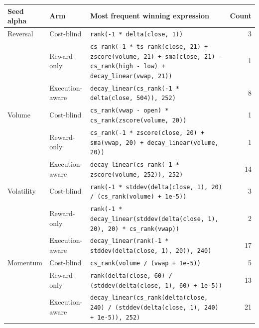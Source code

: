 \begin{tabular}{llp{}r}
\toprule
Seed alpha & Arm & Most frequent winning expression & Count \\
\midrule
Reversal & Cost-blind & \texttt{\footnotesize rank(-1 * delta(close, 1))} & 3 \\
 & Reward-only & \texttt{\footnotesize cs\_rank(-1 * ts\_rank(close, 21) + zscore(volume, 21) + sma(close, 21) - cs\_rank(high - low) + decay\_linear(vwap, 21))} & 1 \\
 & Execution-aware & \texttt{\footnotesize decay\_linear(cs\_rank(-1 * delta(close, 504)), 252)} & 8 \\
\addlinespace
Volume & Cost-blind & \texttt{\footnotesize cs\_rank(vwap - open) * cs\_rank(zscore(volume, 20))} & 1 \\
 & Reward-only & \texttt{\footnotesize cs\_rank(-1 * zscore(close, 20) + sma(vwap, 20) + decay\_linear(volume, 20))} & 1 \\
 & Execution-aware & \texttt{\footnotesize decay\_linear(cs\_rank(-1 * zscore(volume, 252)), 252)} & 14 \\
\addlinespace
Volatility & Cost-blind & \texttt{\footnotesize rank(-1 * stddev(delta(close, 1), 20) / (cs\_rank(volume) + 1e-5))} & 3 \\
 & Reward-only & \texttt{\footnotesize rank(-1 * decay\_linear(stddev(delta(close, 1), 20), 20) * cs\_rank(vwap))} & 2 \\
 & Execution-aware & \texttt{\footnotesize decay\_linear(rank(-1 * stddev(delta(close, 1), 20)), 240)} & 17 \\
\addlinespace
Momentum & Cost-blind & \texttt{\footnotesize cs\_rank(volume / (vwap + 1e-5))} & 5 \\
 & Reward-only & \texttt{\footnotesize rank(delta(close, 60) / (stddev(delta(close, 1), 60) + 1e-5))} & 13 \\
 & Execution-aware & \texttt{\footnotesize decay\_linear(cs\_rank(delta(close, 240) / (stddev(delta(close, 1), 240) + 1e-5)), 252)} & 21 \\
\bottomrule
\end{tabular}
